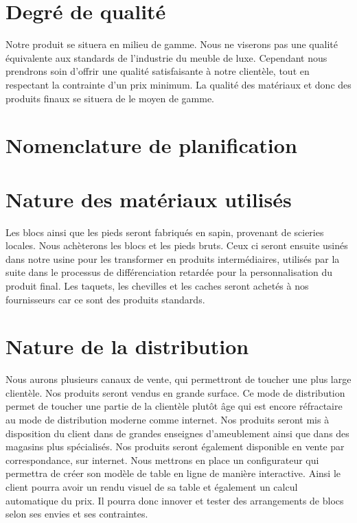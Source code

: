 \section{Degré de qualité}
Notre produit se situera en milieu de gamme. Nous ne viserons pas une qualité équivalente aux standards de l'industrie du meuble de luxe. Cependant nous prendrons soin d'offrir une qualité satisfaisante à notre clientèle, tout en respectant la contrainte d'un prix minimum. La qualité des matériaux et donc des produits finaux se situera de le moyen de gamme.

\section{Nomenclature de planification}

\section{Nature des matériaux utilisés}
Les blocs ainsi que les pieds seront fabriqués en sapin, provenant de scieries locales. Nous achèterons les blocs et les pieds bruts. Ceux ci seront ensuite usinés dans notre usine pour les transformer en produits intermédiaires, utilisés par la suite dans le processus de différenciation retardée pour la personnalisation du produit final. 
Les taquets, les chevilles et les caches seront achetés à nos fournisseurs car ce sont des produits standards. 

\section{Nature de la distribution}
Nous aurons plusieurs canaux de vente, qui permettront de toucher une plus large clientèle.
Nos produits seront vendus en grande surface. Ce mode de distribution permet de toucher une partie de la clientèle plutôt âge qui est encore réfractaire au mode de distribution moderne comme internet. Nos produits seront mis à disposition du client dans de grandes enseignes d'ameublement ainsi que dans des magasins plus spécialisés. 
Nos produits seront également disponible en vente par correspondance, sur internet. Nous mettrons en place un configurateur qui permettra de créer son modèle de table en ligne de manière interactive. Ainsi le client pourra avoir un rendu visuel de sa table et également un calcul automatique du prix. Il pourra donc innover et tester des arrangements de blocs selon ses envies et ses contraintes. 

